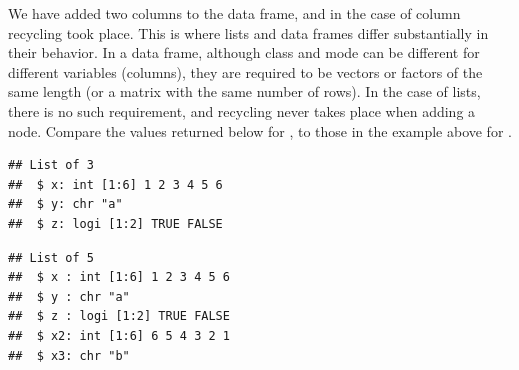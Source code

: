 \documentclass[krantz2]{krantz}\usepackage{knitr}
\begin{document}
We have added two columns to the data frame, and in the case of column  recycling took place. This is where lists and data frames differ substantially in their behavior. In a data frame, although class and mode can be different for different variables (columns), they are required to be vectors or factors of the same length (or a matrix with the same number of rows). In the case of lists, there is no such requirement, and recycling never takes place when adding a node. Compare the values returned below for , to those in the example above for .

\begin{knitrout}\footnotesize
{}\color{fgcolor}\begin{kframe}
\begin{alltt}
 \hlkwb{<-} \hlstd{(} \hlstd{=} \hlopt{:}\hlstd{,}  \hlstd{=} \hlstd{,}  \hlstd{=} \hlstd{(}\hlstd{,} \hlstd{))}
\end{alltt}
\begin{verbatim}
## List of 3
##  $ x: int [1:6] 1 2 3 4 5 6
##  $ y: chr "a"
##  $ z: logi [1:2] TRUE FALSE
\end{verbatim}
\begin{alltt}
\hlopt{$} \hlkwb{<-} \hlopt{:}
\hlopt{$} \hlkwb{<-} 
\end{alltt}
\begin{verbatim}
## List of 5
##  $ x : int [1:6] 1 2 3 4 5 6
##  $ y : chr "a"
##  $ z : logi [1:2] TRUE FALSE
##  $ x2: int [1:6] 6 5 4 3 2 1
##  $ x3: chr "b"
\end{verbatim}
\end{kframe}
\end{knitrout}
\end{document}
